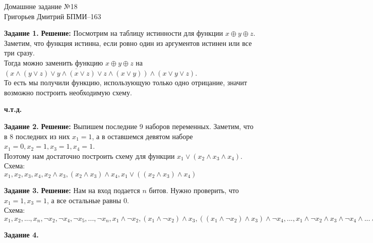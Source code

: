 \documentclass[12pt,a4paper]{scrartcl}
\begin{document}
	\begin{center}	
		Домашнне задание №18 \\
		Григорьев Дмитрий БПМИ--163
	\end{center}
	\textbf{Задание 1.}
	\newline
	\textbf{Решение:}
	\newline
	\indent
	Посмотрим на таблицу истинности для функции $x \oplus y \oplus z$. \\
	Заметим, что функция истинна, если ровно один из аргументов истинен или все три сразу. \\
	Тогда можно заменить функцию $x \oplus y \oplus z$ на $ \overline{(x \land (y \lor z) \lor y \land (x \lor z) \lor z \land (x \lor y))} \land (x \lor y \lor z)$. \\
	То есть мы получили функцию, использующую только одно отрицание, значит возможно построить необходимую схему.
	\begin{flushright}	
		\textbf{ч.т.д.}
	\end{flushright}
	\textbf{Задание 2.} 
	\newline
	\textbf{Решение:}
	\newline
	\indent
	Выпишем последние 9 наборов переменных. Заметим, что в 8 последних из них $x_1 = 1$, а в оставшемся девятом наборе $x_1 = 0, x_2 = 1, x_3 = 1, x_4 = 1$. \\
	Поэтому нам достаточно построить схему для функции $x_1 \lor (x_2 \land x_3 \land x_4)$. \\
	Схема:\\
	$x_1, x_2, x_3, x_4, x_2 \land x_3, (x_2 \land x_3) \land x_4, x_1 \lor ((x_2 \land x_3) \land x_4)$
	\begin{flushright}	
		\textbf{}
	\end{flushright}
	\textbf{Задание 3.} 
	\newline
	\textbf{Решение:} 
	\newline
	\indent
	Нам на вход подается $n$ битов. Нужно проверить, что $x_1 = 1, x_3 = 1$, а все остальные равны 0. \\
	Схема:\\
	$x_1, x_2, ... , x_n, \neg x_2, \neg x_4, \neg x_5, ... , \neg x_n, x_1 \land \neg x_2 , (x_1 \land \neg x_2) \land x_3, ((x_1 \land \neg x_2) \land x_3) \land \neg x_4, ... , x_1 \land \neg x_2 \land x_3 \land \neg x_4 \land ... \land \neg x_n$
	\begin{flushright}
		\textbf{}
	\end{flushright}
	\noindent
	\textbf{Задание 4.} 
	\newline
\end{document}
